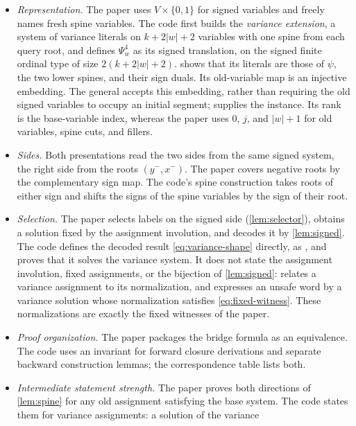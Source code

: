 \begin{itemize}[leftmargin=*]
\item \emph{Representation.} The paper uses $V\times\{0,1\}$ for signed variables and freely names
fresh spine variables. The code first builds the \emph{variance extension},
a system of variance literals on $k+2|w|+2$ variables with one spine from
each query root, and defines $\Psi^4_w$ as its signed translation, on the
signed finite ordinal type of size $2(k+2|w|+2)$.
 shows that its literals are those of
$\psi$, the two lower spines, and their sign duals. Its old-variable map is
an injective embedding.
The general  accepts this embedding, rather than
requiring the old signed variables to occupy an initial segment;
 supplies the instance. Its rank is
the base-variable index, whereas the paper uses $0$, $j$, and $|w|+1$
for old variables, spine cuts, and fillers.
\item \emph{Sides.} Both presentations read the two sides from the same
signed system, the right side from the roots $(y^-,x^-)$. The paper covers
negative roots by the complementary sign map. The code's spine construction
takes roots of either sign and shifts the signs of the spine variables by
the sign of their root.
\item \emph{Selection.} The paper selects labels on the signed side
(\cref{lem:selector}), obtains a solution fixed by the assignment
involution, and decodes it by \cref{lem:signed}. The code defines the
decoded result \eqref{eq:variance-shape} directly, as ,
and proves that it solves the variance system. It does not state the
assignment involution, fixed assignments, or the bijection of
\cref{lem:signed}:  relates a variance assignment to
its normalization, and  expresses an
unsafe word by a variance solution whose normalization satisfies
\eqref{eq:fixed-witness}. These normalizations are exactly the fixed
witnesses of the paper.
\item \emph{Proof organization.} The paper packages the bridge formula as an equivalence.
The code uses an invariant for forward closure derivations and separate
backward construction lemmas; the correspondence table lists both.
\item \emph{Intermediate statement strength.} The paper proves both directions of
\cref{lem:spine} for any old assignment satisfying the base system.
The code states them for variance assignments: a solution of the variance

\end{itemize}
